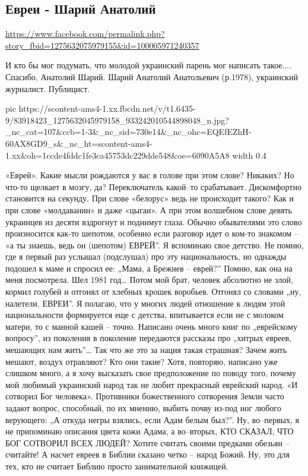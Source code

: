  
 
 
 
 

\subsection{Евреи - Шарий Анатолий}
\url{https://www.facebook.com/permalink.php?story_fbid=1275632075979155&id=100005971240357}

И кто бы мог подумать, что молодой украинский парень мог написать такое....
Спасибо, Анатолий Шарий.  Шарий Анатолий Анатольевич (р.1978), украинский
журналист. Публицист.

\ifcmt
  pic https://scontent-ams4-1.xx.fbcdn.net/v/t1.6435-9/83918423_1275632045979158_933242010544898048_n.jpg?_nc_cat=107&ccb=1-3&_nc_sid=730e14&_nc_ohc=EQEfEZhH-60AX8GD9_s&_nc_ht=scontent-ams4-1.xx&oh=1ccde4fddc1fe3ca45753dc229dde548&oe=6090A5A8
  width 0.4
\fi

«Еврей». Какие мысли рождаются у вас в голове при этом слове? Никаких? Но
что-то щелкает в мозгу, да? Переключатель какой–то срабатывает. Дискомфортно
становится на секунду. При слове «белорус» ведь не происходит такого? Как и при
слове «молдаванин» и даже «цыган». А при этом волшебном слове девять украинцев
из десяти вздрогнут и поднимут глаза. Обычно обывателями это слово произносится
как-то шепотом, особенно если разговор идет о ком-то знакомом – «а ты знаешь,
ведь он (шепотом) ЕВРЕЙ”. Я вспоминаю свое детство. Не помню, где я первый раз
услышал (подслушал) про эту национальность, но однажды подошел к маме и спросил
ее: „Мама, а Брежнев – еврей?” Помню, как она на меня посмотрела. Шел 1981 год…
Потом мой брат, человек абсолютно не злой, кормил голубей и отгонял от хлебных
крошек воробьев. Отгонял со словами „ну, налетели, ЕВРЕИ”. Я полагаю, что у
многих людей отношение к людям этой национальности формируется еще с детства,
впитывается если не с молоком матери, то с манной кашей – точно.  Написано
очень много книг по „еврейскому вопросу”, из поколения в поколение передаются
рассказы про „хитрых евреев, мешающих нам жить”… Так что же это за нация такая
страшная? Зачем жить мешают, воздух отравляют? Кто они такие? Хотя, повторяю,
написано уже слишком много, а я хочу высказать свое предположение по поводу
того, почему мой любимый украинский народ так не любит прекрасный еврейский
народ. «И сотворил Бог человека». Противники божественного сотворения Земли
часто задают вопрос, способный, по их мнению, выбить почву из-под ног любого
верующего: „А откуда негры взялись, если Адам белым был?”. Ну, во–первых, я не
припоминаю описания цвета кожи Адама, а во–вторых, КТО СКАЗАЛ, ЧТО БОГ СОТВОРИЛ
ВСЕХ ЛЮДЕЙ? Хотите считать своими предками обезьян – считайте! А насчет евреев
в Библии сказано четко – народ Божий. Ну, это для тех, кто не считает Библию
просто занимательной книжицей. 


